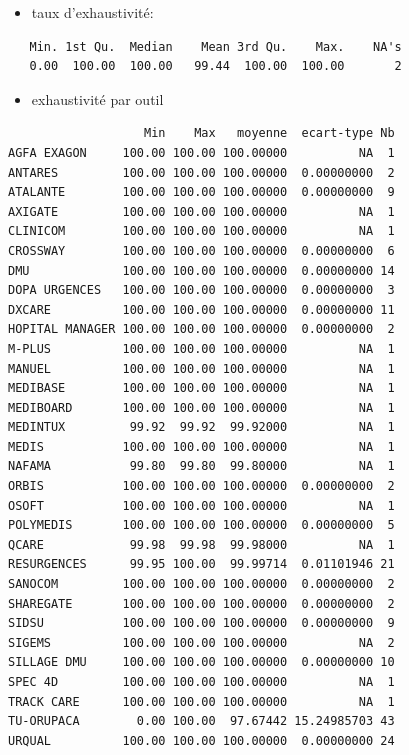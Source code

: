 \documentclass[]{article}
\providecommand{\tightlist}{%
  \setlength{\itemsep}{0pt}\setlength{\parskip}{0pt}}
\begin{document}
\begin{itemize}
\tightlist
\item
  taux d'exhaustivité:
\end{itemize}

\begin{verbatim}
   Min. 1st Qu.  Median    Mean 3rd Qu.    Max.    NA's 
   0.00  100.00  100.00   99.44  100.00  100.00       2 
\end{verbatim}

\begin{itemize}
\tightlist
\item
  exhaustivité par outil
\end{itemize}

\begin{verbatim}
                   Min    Max   moyenne  ecart-type Nb
AGFA EXAGON     100.00 100.00 100.00000          NA  1
ANTARES         100.00 100.00 100.00000  0.00000000  2
ATALANTE        100.00 100.00 100.00000  0.00000000  9
AXIGATE         100.00 100.00 100.00000          NA  1
CLINICOM        100.00 100.00 100.00000          NA  1
CROSSWAY        100.00 100.00 100.00000  0.00000000  6
DMU             100.00 100.00 100.00000  0.00000000 14
DOPA URGENCES   100.00 100.00 100.00000  0.00000000  3
DXCARE          100.00 100.00 100.00000  0.00000000 11
HOPITAL MANAGER 100.00 100.00 100.00000  0.00000000  2
M-PLUS          100.00 100.00 100.00000          NA  1
MANUEL          100.00 100.00 100.00000          NA  1
MEDIBASE        100.00 100.00 100.00000          NA  1
MEDIBOARD       100.00 100.00 100.00000          NA  1
MEDINTUX         99.92  99.92  99.92000          NA  1
MEDIS           100.00 100.00 100.00000          NA  1
NAFAMA           99.80  99.80  99.80000          NA  1
ORBIS           100.00 100.00 100.00000  0.00000000  2
OSOFT           100.00 100.00 100.00000          NA  1
POLYMEDIS       100.00 100.00 100.00000  0.00000000  5
QCARE            99.98  99.98  99.98000          NA  1
RESURGENCES      99.95 100.00  99.99714  0.01101946 21
SANOCOM         100.00 100.00 100.00000  0.00000000  2
SHAREGATE       100.00 100.00 100.00000  0.00000000  2
SIDSU           100.00 100.00 100.00000  0.00000000  9
SIGEMS          100.00 100.00 100.00000          NA  2
SILLAGE DMU     100.00 100.00 100.00000  0.00000000 10
SPEC 4D         100.00 100.00 100.00000          NA  1
TRACK CARE      100.00 100.00 100.00000          NA  1
TU-ORUPACA        0.00 100.00  97.67442 15.24985703 43
URQUAL          100.00 100.00 100.00000  0.00000000 24
\end{verbatim}
\end{document}
